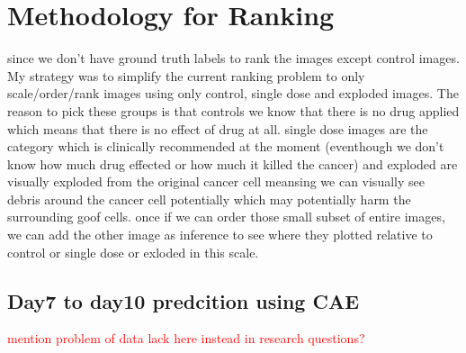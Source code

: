 \chapter{Methodology for Ranking}\label{ch:Methodology for Ranking}
 
since we don't have ground truth labels to rank the images except control images.
My strategy was to simplify the current ranking problem to only scale/order/rank images 
using only control, single dose and exploded images.
The reason to pick these groups is that controls we know that there is no drug applied which means that there is no effect of drug at all. 
single dose images are the category which is clinically recommended at the moment (eventhough we don't know how much drug effected or how 
much it killed the cancer) 
and exploded are visually exploded from the original cancer cell meansing we can visually see debris around the cancer cell potentially which
 may potentially harm the surrounding goof cells.
once if we can order those small subset of entire images, we can add the other image as inference to see where they plotted relative to 
control 
or single dose or exloded in this scale.

\section{Day7 to day10 predcition using CAE} \label{subsec:day7-to-day10}


\textcolor{red}{mention problem of data lack here instead in research questions?}

